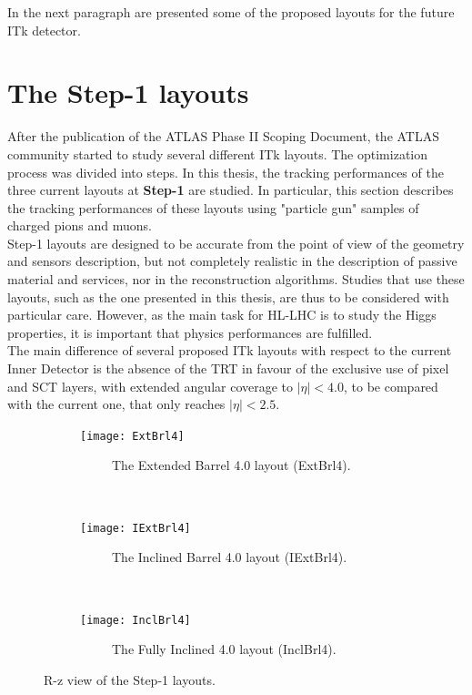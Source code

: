 \documentclass[a4paper,twoside,12pt]{book}
\begin{document}
In the next paragraph are presented some of the proposed layouts for the future ITk detector.

\section{The Step-1 layouts}
After the publication of the ATLAS Phase II Scoping Document\cite{scoping}, the ATLAS community 
started to study several different ITk layouts. The optimization process was divided into steps. In this thesis, the
tracking performances of the three current layouts at \textbf{Step-1} are studied. In particular,
this section describes the tracking performances of these layouts using "particle gun" samples of charged
pions and muons.\\

Step-1 layouts are designed to 
be accurate from the point of view of the geometry and sensors description, but not completely realistic in the description
 of passive material and services, nor in the
reconstruction algorithms. Studies that use these layouts, such as the one presented
in this thesis, are thus to be considered with particular care. However, as the main
task for HL-LHC is to study the Higgs properties, it is important that physics performances are fulfilled. \\

The main difference of several proposed ITk layouts with respect
to the current Inner Detector is the absence of the TRT in favour of the exclusive use of
pixel and SCT layers, with extended angular coverage to $|\eta| < 4.0$, to be compared
with the current one, that only reaches $|\eta| < 2.5$. \\

\begin{figure}
\captionsetup[subfigure]{justification=centering}
\begin{subfigure}{\linewidth}
\centering
\texttt{[image: ExtBrl4]}
\caption{\ \ \ \ \ The Extended Barrel 4.0 layout (ExtBrl4).}
\label{fig:tracking:ExtBrl4}
\end{subfigure}\\[1ex]
\begin{subfigure}{\linewidth}
\centering
\texttt{[image: IExtBrl4]}
\caption{\ \ \ \ \ The Inclined Barrel 4.0 layout (IExtBrl4).}
\label{fig:tracking:IExtBrl4}
\end{subfigure}\\[1ex]
\begin{subfigure}{\linewidth}
\centering
\texttt{[image: InclBrl4]}
\caption{\ \ \ \ \ The Fully Inclined 4.0 layout (InclBrl4).}
\label{fig:tracking:InclBrl4}
\end{subfigure}
\caption{R-z view of the Step-1 layouts.}
\label{fig:tracking:layouts}
\end{figure}
\end{document}
